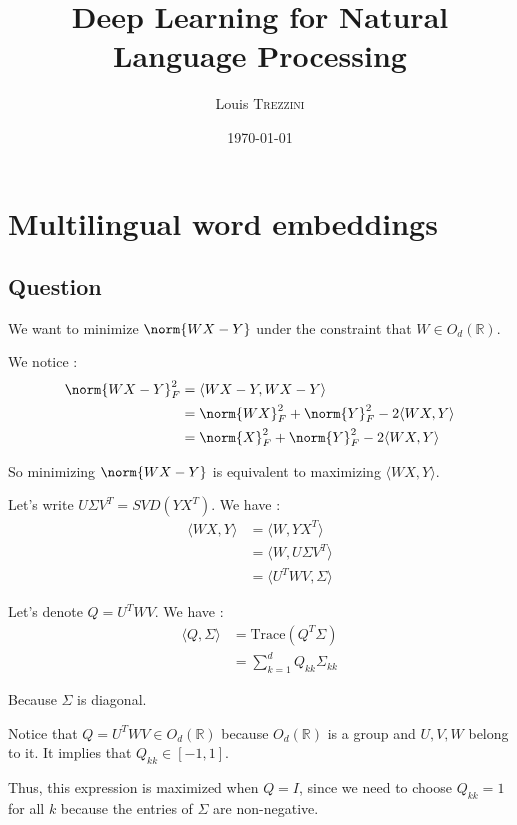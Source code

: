 \documentclass[11pt]{enpc-article}
\title{\vspace{-2em}Deep Learning for Natural Language Processing}
\author{Louis \textsc{Trezzini}}
\date{\today}
\begin{document}
\maketitle

\setcounter{section}{1}

\section{Multilingual word embeddings}

\subsection*{Question}

We want to minimize $\norm{W X - Y}$ under the constraint that $W \in O_d(\mathbb{R})$.

We notice :
\begin{align*}
  \norm{W X - Y}_F^2
  &= \langle W X - Y, W X - Y \rangle \\
  &= \norm{W X}_F^2 + \norm{Y}_F^2 - 2 \langle W X, Y \rangle \\
  &= \norm{X}_F^2 + \norm{Y}_F^2 - 2 \langle W X, Y \rangle
\end{align*}

So minimizing $\norm{W X - Y}$ is equivalent to maximizing $\langle W X, Y \rangle$.

Let's write $U \Sigma V^T = SVD(Y X^T)$. We have :
\begin{align*}
  \langle W X, Y \rangle
  &= \langle W, Y X^T \rangle \\
  &= \langle W, U \Sigma V^T \rangle \\
  &= \langle U^T W V, \Sigma \rangle
\end{align*}

Let's denote $Q = U^T W V$. We have :
\begin{align*}
  \langle Q, \Sigma \rangle
  &= \text{Trace}(Q^T \Sigma) \\
  &= \sum_{k = 1}^{d} Q_{kk} \Sigma_{kk}
\end{align*}

Because $\Sigma$ is diagonal.

Notice that $Q = U^T W V \in O_d(\mathbb{R})$ because $O_d(\mathbb{R})$ is a group and $U, V, W$ belong to it. It implies that $Q_{kk} \in [-1,1]$.

Thus, this expression is maximized when $Q = I$, since we need to choose $Q_{kk}=1$ for all $k$ because the entries of $\Sigma$ are non-negative.
\end{document}
